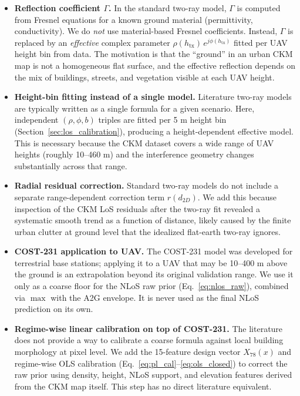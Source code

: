 \documentclass[11pt,a4paper]{article}
\begin{document}
\begin{itemize}
\item \textbf{Reflection coefficient $\Gamma$.}
      In the standard two-ray model, $\Gamma$ is computed from Fresnel equations
      for a known ground material (permittivity, conductivity). We do
      \emph{not} use material-based Fresnel coefficients. Instead, $\Gamma$ is
      replaced by an \emph{effective} complex parameter
      $\rho(h_{\mathrm{tx}})\,e^{j\phi(h_{\mathrm{tx}})}$ fitted per UAV
      height bin from data. The motivation is that the ``ground'' in an urban
      CKM map is not a homogeneous flat surface, and the effective reflection
      depends on the mix of buildings, streets, and vegetation visible at each
      UAV height.

\item \textbf{Height-bin fitting instead of a single model.}
      Literature two-ray models are typically written as a single formula for a
      given scenario. Here, independent $(\rho, \phi, b)$ triples are fitted
      per 5 m height bin (Section~\ref{sec:los_calibration}), producing a
      height-dependent effective model. This is necessary because the CKM
      dataset covers a wide range of UAV heights (roughly 10--460 m) and the
      interference geometry changes substantially across that range.

\item \textbf{Radial residual correction.}
      Standard two-ray models do not include a separate range-dependent
      correction term $r(d_{2D})$. We add this because inspection of the CKM
      LoS residuals after the two-ray fit revealed a systematic smooth trend as
      a function of distance, likely caused by the finite urban clutter at
      ground level that the idealized flat-earth two-ray ignores.

\item \textbf{COST-231 application to UAV.}
      The COST-231 model was developed for terrestrial base stations; applying
      it to a UAV that may be 10--400 m above the ground is an extrapolation
      beyond its original validation range. We use it only as a coarse floor
      for the NLoS raw prior (Eq.~\ref{eq:nlos_raw}), combined via $\max$ with
      the A2G envelope. It is never used as the final NLoS prediction on its
      own.

\item \textbf{Regime-wise linear calibration on top of COST-231.}
      The literature does not provide a way to calibrate a coarse formula
      against local building morphology at pixel level. We add the 15-feature
      design vector $X_{78}(x)$ and regime-wise OLS calibration
      (Eq.~\ref{eq:pl_cal}--\ref{eq:ols_closed}) to correct the raw prior
      using density, height, NLoS support, and elevation features derived from
      the CKM map itself. This step has no direct literature equivalent.
\end{itemize}
\end{document}
